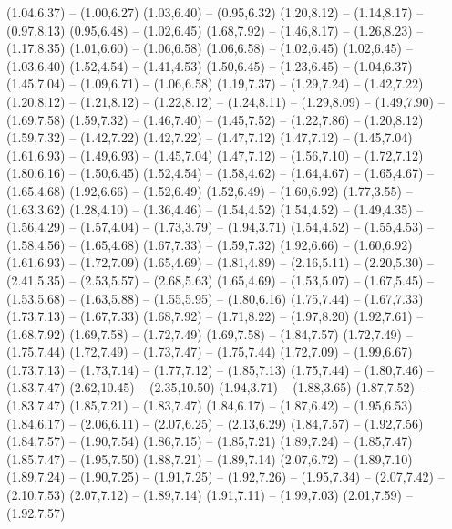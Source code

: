 \providecommand\Bahn[1]{\csname geo:Bahn:#1\endcsname}
\def\BahnListe{alle}
\expandafter\def\csname geo:Bahn:alle\endcsname{
  (1.04,6.37) -- (1.00,6.27)
  (1.03,6.40) -- (0.95,6.32)
  (1.20,8.12) -- (1.14,8.17) -- (0.97,8.13)
  (0.95,6.48) -- (1.02,6.45)
  (1.68,7.92) -- (1.46,8.17) -- (1.26,8.23) -- (1.17,8.35)
  (1.01,6.60) -- (1.06,6.58)
  (1.06,6.58) -- (1.02,6.45)
  (1.02,6.45) -- (1.03,6.40)
  (1.52,4.54) -- (1.41,4.53)
  (1.50,6.45) -- (1.23,6.45) -- (1.04,6.37)
  (1.45,7.04) -- (1.09,6.71) -- (1.06,6.58)
  (1.19,7.37) -- (1.29,7.24) -- (1.42,7.22)
  (1.20,8.12) -- (1.21,8.12) -- (1.22,8.12) -- (1.24,8.11) -- (1.29,8.09) -- (1.49,7.90) -- (1.69,7.58)
  (1.59,7.32) -- (1.46,7.40) -- (1.45,7.52) -- (1.22,7.86) -- (1.20,8.12)
  (1.59,7.32) -- (1.42,7.22)
  (1.42,7.22) -- (1.47,7.12)
  (1.47,7.12) -- (1.45,7.04)
  (1.61,6.93) -- (1.49,6.93) -- (1.45,7.04)
  (1.47,7.12) -- (1.56,7.10) -- (1.72,7.12)
  (1.80,6.16) -- (1.50,6.45)
  (1.52,4.54) -- (1.58,4.62) -- (1.64,4.67) -- (1.65,4.67) -- (1.65,4.68)
  (1.92,6.66) -- (1.52,6.49)
  (1.52,6.49) -- (1.60,6.92)
  (1.77,3.55) -- (1.63,3.62)
  (1.28,4.10) -- (1.36,4.46) -- (1.54,4.52)
  (1.54,4.52) -- (1.49,4.35) -- (1.56,4.29) -- (1.57,4.04) -- (1.73,3.79) -- (1.94,3.71)
  (1.54,4.52) -- (1.55,4.53) -- (1.58,4.56) -- (1.65,4.68)
  (1.67,7.33) -- (1.59,7.32)
  (1.92,6.66) -- (1.60,6.92)
  (1.61,6.93) -- (1.72,7.09)
  (1.65,4.69) -- (1.81,4.89) -- (2.16,5.11) -- (2.20,5.30) -- (2.41,5.35) -- (2.53,5.57) -- (2.68,5.63)
  (1.65,4.69) -- (1.53,5.07) -- (1.67,5.45) -- (1.53,5.68) -- (1.63,5.88) -- (1.55,5.95) -- (1.80,6.16)
  (1.75,7.44) -- (1.67,7.33)
  (1.73,7.13) -- (1.67,7.33)
  (1.68,7.92) -- (1.71,8.22) -- (1.97,8.20)
  (1.92,7.61) -- (1.68,7.92)
  (1.69,7.58) -- (1.72,7.49)
  (1.69,7.58) -- (1.84,7.57)
  (1.72,7.49) -- (1.75,7.44)
  (1.72,7.49) -- (1.73,7.47) -- (1.75,7.44)
  (1.72,7.09) -- (1.99,6.67)
  (1.73,7.13) -- (1.73,7.14) -- (1.77,7.12) -- (1.85,7.13)
  (1.75,7.44) -- (1.80,7.46) -- (1.83,7.47)
  (2.62,10.45) -- (2.35,10.50)
  (1.94,3.71) -- (1.88,3.65)
  (1.87,7.52) -- (1.83,7.47)
  (1.85,7.21) -- (1.83,7.47)
  (1.84,6.17) -- (1.87,6.42) -- (1.95,6.53)
  (1.84,6.17) -- (2.06,6.11) -- (2.07,6.25) -- (2.13,6.29)
  (1.84,7.57) -- (1.92,7.56)
  (1.84,7.57) -- (1.90,7.54)
  (1.86,7.15) -- (1.85,7.21)
  (1.89,7.24) -- (1.85,7.47)
  (1.85,7.47) -- (1.95,7.50)
  (1.88,7.21) -- (1.89,7.14)
  (2.07,6.72) -- (1.89,7.10)
  (1.89,7.24) -- (1.90,7.25) -- (1.91,7.25) -- (1.92,7.26) -- (1.95,7.34) -- (2.07,7.42) -- (2.10,7.53)
  (2.07,7.12) -- (1.89,7.14)
  (1.91,7.11) -- (1.99,7.03)
  (2.01,7.59) -- (1.92,7.57)
}
